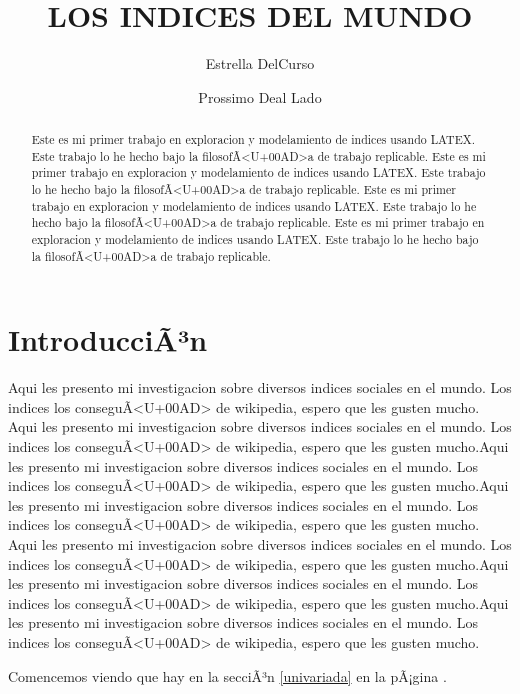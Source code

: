 \documentclass{article}
\title{LOS INDICES DEL MUNDO}
\author[1]{\normalsize Estrella DelCurso}
\author[2]{\normalsize Prossimo Deal Lado}
\affil[1,2]{\small  Escuela de IngenierÃ<U+00AD>a,Universidad de la vida\\
\texttt{{delcurso,deallado}@vida.edu}}
\affil[1]{\small Instituto de altas investigaciones financieras\\
Banco del Parque\\
\texttt{delcurso@bp.com}}
\date{}
\begin{document}


\maketitle


\begin{abstract}
Este es mi primer trabajo en exploracion y modelamiento de indices usando LATEX. Este trabajo lo he hecho bajo la filosofÃ<U+00AD>a de trabajo replicable. Este es mi primer trabajo en exploracion y modelamiento de indices usando LATEX. Este trabajo lo he hecho bajo la filosofÃ<U+00AD>a de trabajo replicable. Este es mi primer trabajo en exploracion y modelamiento de indices usando LATEX. Este trabajo lo he hecho bajo la filosofÃ<U+00AD>a de trabajo replicable. Este es mi primer trabajo en exploracion y modelamiento de indices usando LATEX. Este trabajo lo he hecho bajo la filosofÃ<U+00AD>a de trabajo replicable.
\end{abstract}

\section*{IntroducciÃ³n}

Aqui les presento mi investigacion sobre diversos indices sociales en el mundo. Los indices los conseguÃ<U+00AD> de wikipedia, espero que les gusten mucho. Aqui les presento mi investigacion sobre diversos indices sociales en el mundo. Los indices los conseguÃ<U+00AD> de wikipedia, espero que les gusten mucho.Aqui les presento mi investigacion sobre diversos indices sociales en el mundo. Los indices los conseguÃ<U+00AD> de wikipedia, espero que les gusten mucho.Aqui les presento mi investigacion sobre diversos indices sociales en el mundo. Los indices los conseguÃ<U+00AD> de wikipedia, espero que les gusten mucho.
Aqui les presento mi investigacion sobre diversos indices sociales en el mundo. Los indices los conseguÃ<U+00AD> de wikipedia, espero que les gusten mucho.Aqui les presento mi investigacion sobre diversos indices sociales en el mundo. Los indices los conseguÃ<U+00AD> de wikipedia, espero que les gusten mucho.Aqui les presento mi investigacion sobre diversos indices sociales en el mundo. Los indices los conseguÃ<U+00AD> de wikipedia, espero que les gusten mucho.

Comencemos viendo que hay en la secciÃ³n \ref{univariada} en la pÃ¡gina \pageref{univariada}.

\clearpage
\end{document}
